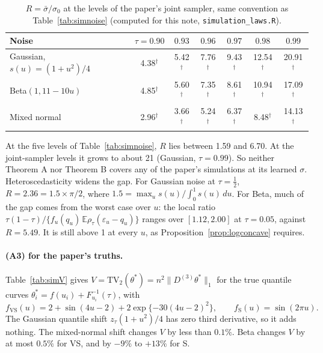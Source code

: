 \documentclass[11pt]{article}
\newcommand{\E}{\mathbb{E}}
\newcommand{\norm}[1]{\lVert #1\rVert}
\newcommand{\Dthree}{D^{(3)}}
\newcommand{\TV}{\mathrm{TV}}
\newcommand{\sbar}{\bar\sigma}
\theoremstyle{plain}
\theoremstyle{definition}
\theoremstyle{remark}
\begin{document}
\begin{table}[h]
\centering\small
\caption{$R=\sbar/\sigma_0$ at the levels of the paper's joint sampler, same convention as Table~\ref{tab:simnoise} (computed for this note, \texttt{simulation\_laws.R}).}
\label{tab:simjoint}
\begin{tabular}{@{}lcccccc@{}}
\toprule
Noise & $\tau=0.90$ & $0.93$ & $0.96$ & $0.97$ & $0.98$ & $0.99$ \\
\midrule
Gaussian, $s(u)=(1+u^2)/4$ & 4.38$^\dagger$ & 5.42$^\dagger$ & 7.76$^\dagger$ & 9.43$^\dagger$ & 12.54$^\dagger$ & 20.91$^\dagger$ \\
Beta$(1,11-10u)$ & 4.85$^\dagger$ & 5.60$^\dagger$ & 7.35$^\dagger$ & 8.61$^\dagger$ & 10.94$^\dagger$ & 17.09$^\dagger$ \\
Mixed normal & 2.96$^\dagger$ & 3.66$^\dagger$ & 5.24$^\dagger$ & 6.37$^\dagger$ & 8.48$^\dagger$ & 14.13$^\dagger$ \\
\bottomrule
\end{tabular}
\end{table}

\noindent At the five levels of Table~\ref{tab:simnoise}, $R$ lies between 1.59 and 6.70. At the joint-sampler levels it grows to about 21 (Gaussian, $\tau=0.99$). So neither Theorem A nor Theorem B covers any of the paper's simulations at its learned $\sigma$. Heteroscedasticity widens the gap. For Gaussian noise at $\tau=\tfrac12$, $R=2.36=1.5\times\pi/2$, where $1.5=\max_u s(u)\big/\!\int_0^1 s(u)\,du$. For Beta, much of the gap comes from the worst case over $u$: the local ratio $\tau(1-\tau)/\{f_u(q_u)\,\E\rho_\tau(\varepsilon_u-q_u)\}$ ranges over $[1.12,2.00]$ at $\tau=0.05$, against $R=5.49$. It is still above 1 at every $u$, as Proposition~\ref{prop:logconcave} requires.

\paragraph{(A3) for the paper's truths.} Table~\ref{tab:simV} gives $V=\TV_2(\theta^*)=n^2\norm{\Dthree\theta^*}_1$ for the true quantile curves $\theta^*_i=f(u_i)+F_{u_i}^{-1}(\tau)$, with
\[
f_{\mathrm{VS}}(u)=2+\sin(4u-2)+2\exp\{-30(4u-2)^2\},\qquad f_{\mathrm S}(u)=\sin(2\pi u).
\]
The Gaussian quantile shift $z_\tau(1+u^2)/4$ has zero third derivative, so it adds nothing. The mixed-normal shift changes $V$ by less than $0.1\%$. Beta changes $V$ by at most $0.5\%$ for VS, and by $-9\%$ to $+13\%$ for S.
\end{document}
